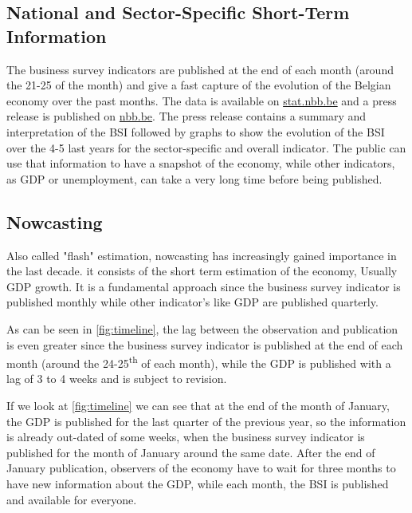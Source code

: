 \documentclass[12pt,a4paper,oneside]{book}
\begin{document}
\subsection{National and Sector-Specific Short-Term Information}


The business survey indicators are published at the end of each month (around the 21-25 of the month) and give a fast capture of the evolution of the Belgian economy over the past months.
The data is available on \href{http://stat.nbb.be/Index.aspx?DataSetCode=BUSSURVM&Lang=en}{stat.nbb.be} and a press release is published on \href{http://www.nbb.be/doc/dq/e/conj.htm}{nbb.be}. 
The press release contains a summary and interpretation of the BSI followed by graphs to show the evolution of the BSI over the 4-5 last years for the sector-specific and overall indicator.
The public can use that information to have a snapshot of the economy, while other indicators, as GDP or unemployment, can take a very long time before being published.


\subsection{Nowcasting}
\label{sec:nowcasting}

Also called "flash" estimation, nowcasting has increasingly gained importance in the last decade.
it consists of the short term estimation of the economy, Usually GDP growth.
It is a fundamental approach since the business survey indicator is published monthly while other indicator's like GDP are published quarterly.

As can be seen in \autoref{fig:timeline}, 
the lag between the observation and publication is even greater since the business survey indicator is published at the end of each month (around the 24-25\textsuperscript{th} of each month), while the GDP is published with a lag of 3 to 4 weeks and is subject to revision.

If we look at \autoref{fig:timeline} we can see that at the end of the month of January, the GDP is published for the last quarter of the previous year, so the information is already out-dated of some weeks, when the business survey indicator is published for the month of January around the same date. After the end of January publication, observers of the economy have to wait for three months to have new information about the GDP, while each month, the BSI is published and available for everyone.
\end{document}

